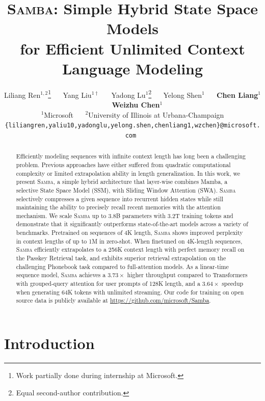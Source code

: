 \documentclass{article}
\title{ \textsc{Samba}: Simple Hybrid State Space Models \\ for Efficient Unlimited Context \\ Language Modeling }
\author{%
Liliang Ren$^{1,2}$\thanks{Work partially done during internship at Microsoft.} ~~ Yang Liu$^{1\dag}$ ~~ Yadong Lu$^{1}$\thanks{Equal second-author contribution.} ~~ Yelong Shen$^1$ ~~ \textbf{Chen Liang}$^1$ ~~ \textbf{Weizhu Chen}$^1$\\
$^1$Microsoft ~~ $^2$University of Illinois at Urbana-Champaign\\
\texttt{\{liliangren,yaliu10,yadonglu,yelong.shen,chenliang1,wzchen\}@microsoft.com }}
\begin{document}
\maketitle

\begin{abstract}
Efficiently modeling sequences with infinite context length has long been a challenging problem. Previous approaches have either suffered from quadratic computational complexity or limited extrapolation ability in length generalization. In this work, we present \textsc{Samba}, a simple hybrid architecture that layer-wise combines Mamba, a selective State Space Model (SSM), with Sliding Window Attention (SWA). \textsc{Samba} selectively compresses a given sequence into recurrent hidden states while still maintaining the ability to precisely recall recent memories with the attention mechanism.
We scale \textsc{Samba} up to 3.8B parameters with 3.2T training tokens and demonstrate that it significantly outperforms state-of-the-art models across a variety of benchmarks. Pretrained on sequences of 4K length, \textsc{Samba} shows improved perplexity in context lengths of up to 1M in zero-shot. When finetuned on 4K-length sequences, \textsc{Samba} efficiently extrapolates to a 256K context length with perfect memory recall on the Passkey Retrieval task, and exhibits superior retrieval extrapolation on the challenging Phonebook task compared to full-attention models. As a linear-time sequence model, \textsc{Samba} achieves a $3.73\times$ higher throughput compared to Transformers with grouped-query attention for user prompts of 128K length, and a $3.64\times$ speedup when generating 64K tokens with unlimited streaming. 
Our code for training on open source data is publicly available at \url{https://github.com/microsoft/Samba}.

\end{abstract}




\section{Introduction}


\end{document}
